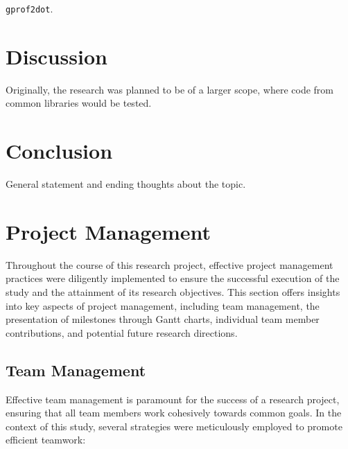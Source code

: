 \documentclass[conference]{IEEEtran}
\begin{document}
\texttt{gprof2dot}. 
\section{Discussion}
Originally, the research was planned to be of a larger scope, where code from common libraries would be tested. 
\section{Conclusion}
General statement and ending thoughts about the topic. 


\section{Project Management}

Throughout the course of this research project, effective project management practices were diligently implemented to ensure the successful execution of the study and the attainment of its research objectives. This section offers insights into key aspects of project management, including team management, the presentation of milestones through Gantt charts, individual team member contributions, and potential future research directions.

\subsection{Team Management}
Effective team management is paramount for the success of a research project, ensuring that all team members work cohesively towards common goals. In the context of this study, several strategies were meticulously employed to promote efficient teamwork:
\end{document}
